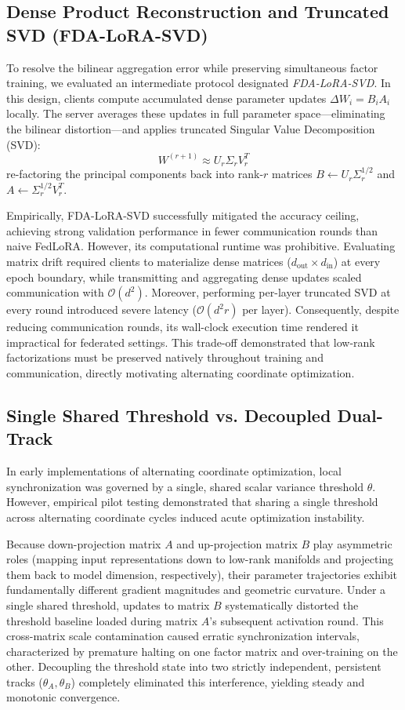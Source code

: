 \subsection{Dense Product Reconstruction and Truncated SVD (FDA-LoRA-SVD)}
To resolve the bilinear aggregation error while preserving simultaneous factor training, we evaluated an intermediate protocol designated \textit{FDA-LoRA-SVD}. In this design, clients compute accumulated dense parameter updates $\Delta W_i = B_i A_i$ locally. The server averages these updates in full parameter space---eliminating the bilinear distortion---and applies truncated Singular Value Decomposition (SVD):
\begin{equation*}
    W^{(r+1)} \approx U_r \Sigma_r V_r^T
\end{equation*}
re-factoring the principal components back into rank-$r$ matrices $B \leftarrow U_r \Sigma_r^{1/2}$ and $A \leftarrow \Sigma_r^{1/2} V_r^T$.

Empirically, FDA-LoRA-SVD successfully mitigated the accuracy ceiling, achieving strong validation performance in fewer communication rounds than naive FedLoRA. However, its computational runtime was prohibitive. Evaluating matrix drift required clients to materialize dense matrices ($d_{\text{out}} \times d_{\text{in}}$) at every epoch boundary, while transmitting and aggregating dense updates scaled communication with $\mathcal{O}(d^2)$. Moreover, performing per-layer truncated SVD at every round introduced severe latency ($\mathcal{O}(d^2 r)$ per layer). Consequently, despite reducing communication rounds, its wall-clock execution time rendered it impractical for federated settings. This trade-off demonstrated that low-rank factorizations must be preserved natively throughout training and communication, directly motivating alternating coordinate optimization.

\subsection{Single Shared Threshold vs. Decoupled Dual-Track}
In early implementations of alternating coordinate optimization, local synchronization was governed by a single, shared scalar variance threshold $\theta$. However, empirical pilot testing demonstrated that sharing a single threshold across alternating coordinate cycles induced acute optimization instability. 

Because down-projection matrix $A$ and up-projection matrix $B$ play asymmetric roles (mapping input representations down to low-rank manifolds and projecting them back to model dimension, respectively), their parameter trajectories exhibit fundamentally different gradient magnitudes and geometric curvature. Under a single shared threshold, updates to matrix $B$ systematically distorted the threshold baseline loaded during matrix $A$'s subsequent activation round. This cross-matrix scale contamination caused erratic synchronization intervals, characterized by premature halting on one factor matrix and over-training on the other. Decoupling the threshold state into two strictly independent, persistent tracks ($\theta_A, \theta_B$) completely eliminated this interference, yielding steady and monotonic convergence.

